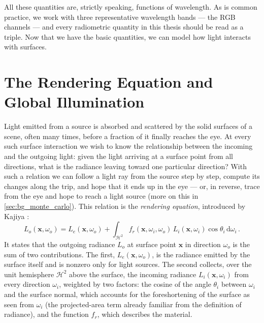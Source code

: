 All these quantities are, strictly speaking, functions of wavelength. As is common practice, we work with three representative wavelength bands --- the RGB channels --- and every radiometric quantity in this thesis should be read as a triple. Now that we have the basic quantities, we can model how light interacts with surfaces.

\section{The Rendering Equation and Global Illumination}
\label{sec:bg_rendering_equation}
Light emitted from a source is absorbed and scattered by the solid surfaces of a scene, often many times, before a fraction of it finally reaches the eye. At every such surface interaction we wish to know the relationship between the incoming and the outgoing light: given the light arriving at a surface point from all directions, what is the radiance leaving toward one particular direction? With such a relation we can follow a light ray from the source step by step, compute its changes along the trip, and hope that it ends up in the eye --- or, in reverse, trace from the eye and hope to reach a light source (more on this in \cref{sec:bg_monte_carlo}). This relation is the \emph{rendering equation}, introduced by Kajiya \cite{kajiya86}:
\begin{equation}
	\label{eq:rendering_equation}
	L_o(\mathbf{x}, \omega_o)
	= L_e(\mathbf{x}, \omega_o)
	+ \int_{\mathcal{H}^2} f_r(\mathbf{x}, \omega_i, \omega_o) \, L_i(\mathbf{x}, \omega_i) \cos\theta_i \,\mathrm{d}\omega_i \,.
\end{equation}
It states that the outgoing radiance $L_o$ at surface point $\mathbf{x}$ in direction $\omega_o$ is the sum of two contributions. The first, $L_e(\mathbf{x}, \omega_o)$, is the radiance emitted by the surface itself and is nonzero only for light sources. The second collects, over the unit hemisphere $\mathcal{H}^2$ above the surface, the incoming radiance $L_i(\mathbf{x}, \omega_i)$ from every direction $\omega_i$, weighted by two factors: the cosine of the angle $\theta_i$ between $\omega_i$ and the surface normal, which accounts for the foreshortening of the surface as seen from $\omega_i$ (the projected-area term already familiar from the definition of radiance), and the function $f_r$, which describes the material.

